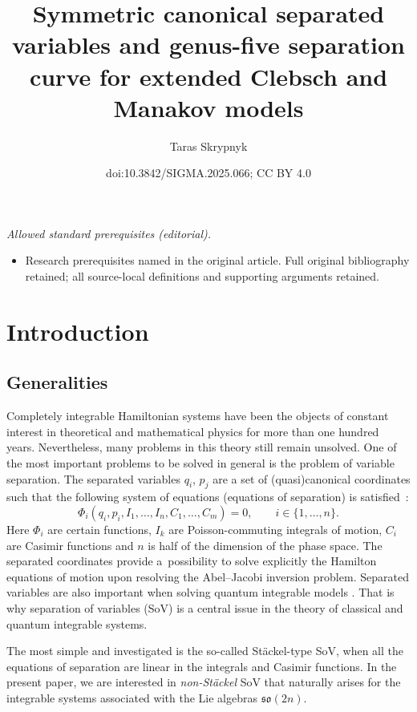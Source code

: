 \documentclass[10pt,a4paper]{amsart}
\title{Symmetric canonical separated variables and genus-five separation curve for extended Clebsch and Manakov models}
\author{Taras Skrypnyk}
\date{doi:10.3842/SIGMA.2025.066; CC BY 4.0}
\numberwithin{equation}{section}
\begin{document}
\maketitle
\noindent\textit{Allowed standard prerequisites (editorial).}\begin{itemize}
\item Research prerequisites named in the original article. Full original bibliography retained; all source-local definitions and supporting arguments retained.
\end{itemize}\medskip
\section{Introduction}
\subsection{Generalities}
Completely integrable Hamiltonian systems have been the objects of constant interest in theoretical and mathematical physics for more than one hundred years. Nevertheless, many problems in this theory still remain unsolved. One of the most important problems to be solved in general is the problem of variable separation. The separated variables $q_i$, $p_j$ are a set of (quasi)canonical coordinates such that the following system of equations (equations of separation) is satisfied~\cite{SklSep}:
\[%
 \Phi_i(q_i, p_i,I_1, \dots ,I_n, C_1, \dots ,C_m) = 0, \qquad i\in \{1,\dots, n\}.
 \]
Here $\Phi_i$ are certain functions, $I_k$ are Poisson-commuting integrals of motion, $C_i$ are Casimir functions
and $n$ is half of the
dimension of the phase space.
The separated coordinates provide a~possibility to solve explicitly the Hamilton equations of motion upon resolving the Abel--Jacobi inversion problem. Separated variables are also important when solving quantum
integrable models \cite{SklSep}. That is why separation of variables (SoV) is a central issue in the theory of classical and quantum integrable systems.

 The most simple and investigated is the so-called St\"ackel-type SoV, when all the equations of separation are linear in the integrals and Casimir functions. In the present paper, we are interested in {\it non-St\"ackel} SoV that naturally arises for the integrable systems associated with the Lie algebras $\mathfrak{so}(2n)$.
\end{document}
